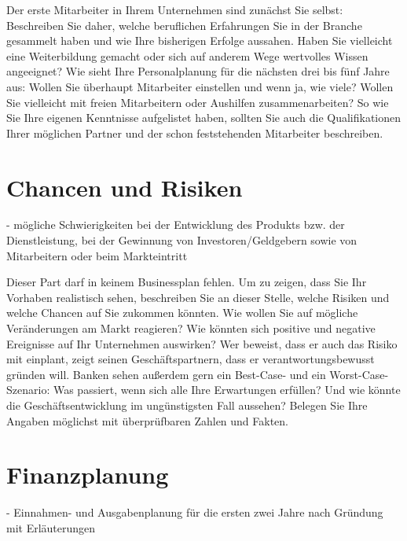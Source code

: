 \documentclass[12pt, a4paper]{article} %
\begin{document}
Der erste Mitarbeiter in Ihrem Unternehmen sind zunächst Sie selbst: Beschreiben Sie daher, welche beruflichen Erfahrungen Sie in der Branche gesammelt haben und wie Ihre bisherigen Erfolge aussahen. Haben Sie vielleicht eine Weiterbildung gemacht oder sich auf anderem Wege wertvolles Wissen angeeignet? Wie sieht Ihre Personalplanung für die nächsten drei bis fünf Jahre aus: Wollen Sie überhaupt Mitarbeiter einstellen und wenn ja, wie viele? Wollen Sie vielleicht mit freien Mitarbeitern oder Aushilfen zusammenarbeiten? So wie Sie Ihre eigenen Kenntnisse aufgelistet haben, sollten Sie auch die Qualifikationen Ihrer möglichen Partner und der schon feststehenden Mitarbeiter beschreiben.

\newpage

\section{Chancen und Risiken}
- mögliche Schwierigkeiten bei der Entwicklung des Produkts bzw. der Dienstleistung, bei der Gewinnung von Investoren/Geldgebern sowie von Mitarbeitern oder beim Markteintritt 

Dieser Part darf in keinem Businessplan fehlen. Um zu zeigen, dass Sie Ihr Vorhaben realistisch sehen, beschreiben Sie an dieser Stelle, welche Risiken und welche Chancen auf Sie zukommen könnten. Wie wollen Sie auf mögliche Veränderungen am Markt reagieren? Wie könnten sich positive und negative Ereignisse auf Ihr Unternehmen auswirken? Wer beweist, dass er auch das Risiko mit einplant, zeigt seinen Geschäftspartnern, dass er verantwortungsbewusst gründen will. Banken sehen außerdem gern ein Best-Case- und ein Worst-Case-Szenario: Was passiert, wenn sich alle Ihre Erwartungen erfüllen? Und wie könnte die Geschäftsentwicklung im ungünstigsten Fall aussehen? Belegen Sie Ihre Angaben möglichst mit überprüfbaren Zahlen und Fakten.

\newpage

\section{Finanzplanung}
- Einnahmen- und Ausgabenplanung für die ersten zwei Jahre nach Gründung mit Erläuterungen 
\end{document}

